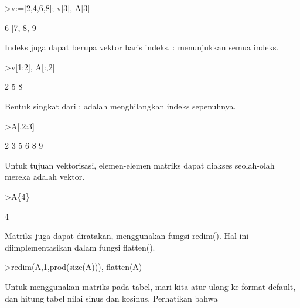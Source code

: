 \documentclass[a4paper,10pt]{article}
\begin{document}
\begin{eulernotebook}
\begin{eulercomment}
\begin{eulercomment}
\begin{eulercomment}
\begin{eulercomment}
\begin{eulercomment}
\begin{eulercomment}
\begin{eulercomment}
\end{eulercomment}
\begin{eulerprompt}
>v:=[2,4,6,8]; v[3], A[3]
\end{eulerprompt}
\begin{euleroutput}
  6
  [7,  8,  9]
\end{euleroutput}
\begin{eulercomment}
Indeks juga dapat berupa vektor baris indeks. : menunjukkan semua
indeks.
\end{eulercomment}
\begin{eulerprompt}
>v[1:2], A[:,2]
\end{eulerprompt}
\begin{euleroutput}
  [2,  4]
              2 
              5 
              8 
\end{euleroutput}
\begin{eulercomment}
Bentuk singkat dari : adalah menghilangkan indeks sepenuhnya.
\end{eulercomment}
\begin{eulerprompt}
>A[,2:3]
\end{eulerprompt}
\begin{euleroutput}
              2             3 
              5             6 
              8             9 
\end{euleroutput}
\begin{eulercomment}
Untuk tujuan vektorisasi, elemen-elemen matriks dapat diakses
seolah-olah mereka adalah vektor.
\end{eulercomment}
\begin{eulerprompt}
>A\{4\}
\end{eulerprompt}
\begin{euleroutput}
  4
\end{euleroutput}
\begin{eulercomment}
Matriks juga dapat diratakan, menggunakan fungsi redim(). Hal ini
diimplementasikan dalam fungsi flatten().
\end{eulercomment}
\begin{eulerprompt}
>redim(A,1,prod(size(A))), flatten(A)
\end{eulerprompt}
\begin{euleroutput}
  [1,  2,  3,  4,  5,  6,  7,  8,  9]
  [1,  2,  3,  4,  5,  6,  7,  8,  9]
\end{euleroutput}
\begin{eulercomment}
Untuk menggunakan matriks pada tabel, mari kita atur ulang ke format
default, dan hitung tabel nilai sinus dan kosinus. Perhatikan bahwa

\end{eulercomment}
\end{eulercomment}
\end{eulercomment}
\end{eulercomment}
\end{eulercomment}
\end{eulercomment}
\end{eulercomment}
\end{eulernotebook}
\end{document}
